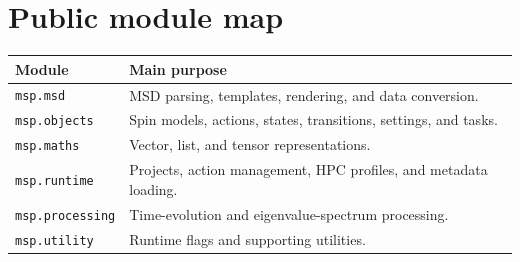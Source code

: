 \documentclass[11pt,a4paper]{article}
\begin{document}
\section{Public module map}

\begin{center}
\begin{tabularx}{\linewidth}{l X}
\toprule
Module & Main purpose \\
\midrule
\texttt{msp.msd} & MSD parsing, templates, rendering, and data conversion. \\
\texttt{msp.objects} & Spin models, actions, states, transitions, settings,
and tasks. \\
\texttt{msp.maths} & Vector, list, and tensor representations. \\
\texttt{msp.runtime} & Projects, action management, HPC profiles, and
metadata loading. \\
\texttt{msp.processing} & Time-evolution and eigenvalue-spectrum processing. \\
\texttt{msp.utility} & Runtime flags and supporting utilities. \\
\bottomrule
\end{tabularx}
\end{center}
\end{document}
